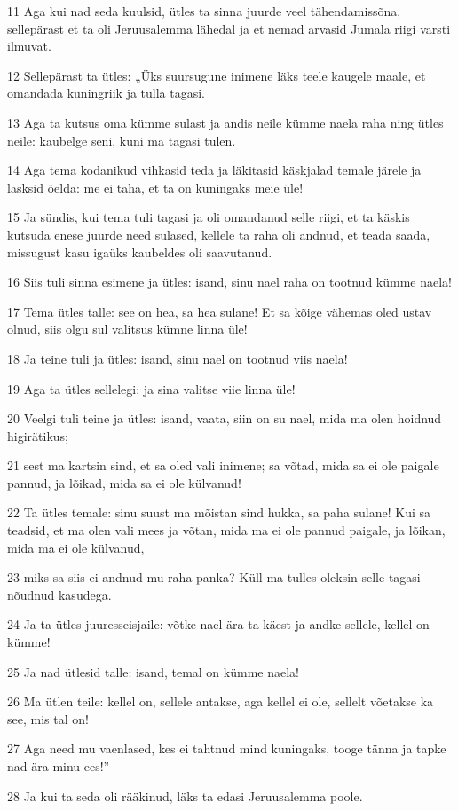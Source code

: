 \par 11 Aga kui nad seda kuulsid, ütles ta sinna juurde veel tähendamissõna, sellepärast et ta oli Jeruusalemma lähedal ja et nemad arvasid Jumala riigi varsti ilmuvat.
\par 12 Sellepärast ta ütles: „Üks suursugune inimene läks teele kaugele maale, et omandada kuningriik ja tulla tagasi.
\par 13 Aga ta kutsus oma kümme sulast ja andis neile kümme naela raha ning ütles neile: kaubelge seni, kuni ma tagasi tulen.
\par 14 Aga tema kodanikud vihkasid teda ja läkitasid käskjalad temale järele ja lasksid öelda: me ei taha, et ta on kuningaks meie üle!
\par 15 Ja sündis, kui tema tuli tagasi ja oli omandanud selle riigi, et ta käskis kutsuda enese juurde need sulased, kellele ta raha oli andnud, et teada saada, missugust kasu igaüks kaubeldes oli saavutanud.
\par 16 Siis tuli sinna esimene ja ütles: isand, sinu nael raha on tootnud kümme naela!
\par 17 Tema ütles talle: see on hea, sa hea sulane! Et sa kõige vähemas oled ustav olnud, siis olgu sul valitsus kümne linna üle!
\par 18 Ja teine tuli ja ütles: isand, sinu nael on tootnud viis naela!
\par 19 Aga ta ütles sellelegi: ja sina valitse viie linna üle!
\par 20 Veelgi tuli teine ja ütles: isand, vaata, siin on su nael, mida ma olen hoidnud higirätikus;
\par 21 sest ma kartsin sind, et sa oled vali inimene; sa võtad, mida sa ei ole paigale pannud, ja lõikad, mida sa ei ole külvanud!
\par 22 Ta ütles temale: sinu suust ma mõistan sind hukka, sa paha sulane! Kui sa teadsid, et ma olen vali mees ja võtan, mida ma ei ole pannud paigale, ja lõikan, mida ma ei ole külvanud,
\par 23 miks sa siis ei andnud mu raha panka? Küll ma tulles oleksin selle tagasi nõudnud kasudega.
\par 24 Ja ta ütles juuresseisjaile: võtke nael ära ta käest ja andke sellele, kellel on kümme!
\par 25 Ja nad ütlesid talle: isand, temal on kümme naela!
\par 26 Ma ütlen teile: kellel on, sellele antakse, aga kellel ei ole, sellelt võetakse ka see, mis tal on!
\par 27 Aga need mu vaenlased, kes ei tahtnud mind kuningaks, tooge tänna ja tapke nad ära minu ees!”
\par 28 Ja kui ta seda oli rääkinud, läks ta edasi Jeruusalemma poole.

